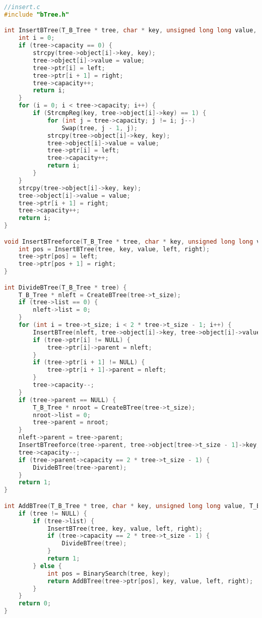 \begin{lstlisting}[language=C]
//insert.c
#include "bTree.h"

int InsertBTree(T_B_Tree * tree, char * key, unsigned long long value, T_B_Tree * left, T_B_Tree * right) {
    int i = 0;
    if (tree->capacity == 0) {
        strcpy(tree->object[i]->key, key);
        tree->object[i]->value = value;
        tree->ptr[i] = left;
        tree->ptr[i + 1] = right;
        tree->capacity++;
        return i;
    }
    for (i = 0; i < tree->capacity; i++) {
        if (StrcmpReg(key, tree->object[i]->key) == 1) {
            for (int j = tree->capacity; j != i; j--)
                Swap(tree, j - 1, j);
            strcpy(tree->object[i]->key, key);
            tree->object[i]->value = value;
            tree->ptr[i] = left;
            tree->capacity++;
            return i;
        }
    }
    strcpy(tree->object[i]->key, key);
    tree->object[i]->value = value;
    tree->ptr[i + 1] = right;
    tree->capacity++;
    return i;
}

void InsertBTreeforce(T_B_Tree * tree, char * key, unsigned long long value, T_B_Tree * left, T_B_Tree * right) {
    int pos = InsertBTree(tree, key, value, left, right);
    tree->ptr[pos] = left;
    tree->ptr[pos + 1] = right;
}

int DivideBTree(T_B_Tree * tree) {
    T_B_Tree * nleft = CreateBTree(tree->t_size);
    if (tree->list == 0) {
        nleft->list = 0;
    }
    for (int i = tree->t_size; i < 2 * tree->t_size - 1; i++) {
        InsertBTree(nleft, tree->object[i]->key, tree->object[i]->value, tree->ptr[i], tree->ptr[i + 1]);
        if (tree->ptr[i] != NULL) {
            tree->ptr[i]->parent = nleft;
        }
        if (tree->ptr[i + 1] != NULL) {
            tree->ptr[i + 1]->parent = nleft;
        }
        tree->capacity--;
    }
    if (tree->parent == NULL) {
        T_B_Tree * nroot = CreateBTree(tree->t_size);
        nroot->list = 0;
        tree->parent = nroot;
    }
    nleft->parent = tree->parent;
    InsertBTreeforce(tree->parent, tree->object[tree->t_size - 1]->key, tree->object[tree->t_size - 1]->value, tree, nleft);
    tree->capacity--;
    if (tree->parent->capacity == 2 * tree->t_size - 1) {
        DivideBTree(tree->parent);
    }
    return 1;
}

int AddBTree(T_B_Tree * tree, char * key, unsigned long long value, T_B_Tree * left, T_B_Tree * right) {
    if (tree != NULL) {
        if (tree->list) {
            InsertBTree(tree, key, value, left, right);
            if (tree->capacity == 2 * tree->t_size - 1) {
                DivideBTree(tree);
            }
            return 1;
        } else {
            int pos = BinarySearch(tree, key);
            return AddBTree(tree->ptr[pos], key, value, left, right);
        }
    }
    return 0;
}
\end{lstlisting}

